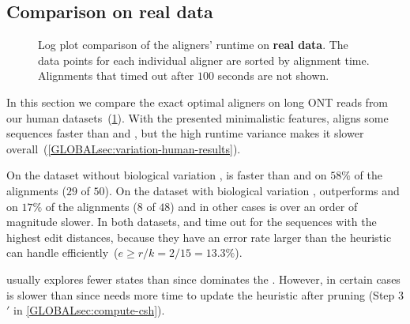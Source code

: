 \subsection{Comparison on real data} \label{GLOBALsec:evals-comparison-hg}

\begin{figure}[t]
  \centering
  \hfill
  \caption[Runtime per sequence (real data)]{Log plot comparison of the
  aligners' runtime on \textbf{real data}. The data points for each individual
  aligner are sorted by alignment time. Alignments that timed out after $100$
  seconds are not shown.}
  \label{GLOBALfig:human-results}
\end{figure}

In this section we compare the exact optimal aligners on long ONT reads from our
human datasets~(\cref{GLOBALfig:human-results}). With the presented minimalistic
features, \astarpa aligns some sequences faster than \wfa and \edlib, but the
high runtime variance makes it slower overall~(\cref{GLOBALsec:variation-human-results}).

On the dataset without biological variation \datasetOne, \SH is faster than \wfa
and \edlib on $58\%$ of the alignments ($29$ of $50$). On the dataset with
biological variation \datasetTwo, \SH outperforms \wfa and \edlib on $17\%$ of the
alignments ($8$ of $48$) and in other cases is over an order of magnitude
slower. In both datasets, \SH and \CSH time out for the sequences with the
highest edit distances, because they have an error rate larger than the
heuristic can handle efficiently~($e\geq r/k=2/15=13.3\%$).

\CSH usually explores fewer states than \SH since \csh dominates
the \sh. However, in certain cases \CSH is slower than \SH since needs more time
to update the heuristic after pruning (Step 3$'$ in \cref{GLOBALsec:compute-csh}).
